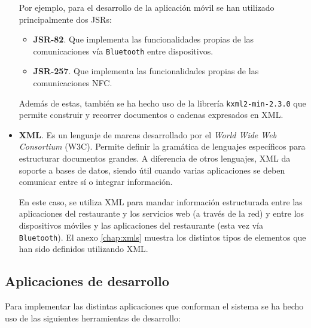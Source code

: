 \begin{itemize}
  Por ejemplo, para el desarrollo de la aplicación móvil se han utilizado
  principalmente dos \acs{JSR}s:
    \begin{itemize}
    \item \textbf{\acs{JSR}-82}. Que implementa las funcionalidades
    propias de las comunicaciones vía \texttt{Bluetooth} entre dispositivos.
    \item \textbf{\acs{JSR}-257}. Que implementa las funcionalidades propias
    de las comunicaciones \acs{NFC}.
    \end{itemize}

  Además de estas, también se ha hecho uso de la librería
  \texttt{kxml2-min-2.3.0} que permite construir y recorrer documentos o 
  cadenas expresados en \acs{XML}.

  \item \textbf{XML}.
  Es un lenguaje de marcas desarrollado por el
  \emph{World Wide Web Consortium} (\acs{W3C}). Permite definir la gramática de
  lenguajes específicos para estructurar documentos grandes. A diferencia de
  otros lenguajes, \acs{XML} da soporte a bases de datos, siendo útil cuando
  varias aplicaciones se deben comunicar entre sí o integrar información.

  En este caso, se utiliza \acs{XML} para mandar información estructurada 
  entre las aplicaciones del restaurante y los servicios web (a través de la
  red) y entre los dispositivos móviles y las aplicaciones del restaurante 
  (esta vez vía \texttt{Bluetooth}). El anexo \ref{chap:xmls} muestra los 
  distintos tipos de elementos que han sido definidos utilizando \acs{XML}.
  \end{itemize}

  \subsection{Aplicaciones de desarrollo}
  Para implementar las distintas aplicaciones que conforman el sistema se
  ha hecho uso de las siguientes herramientas de desarrollo:
  
